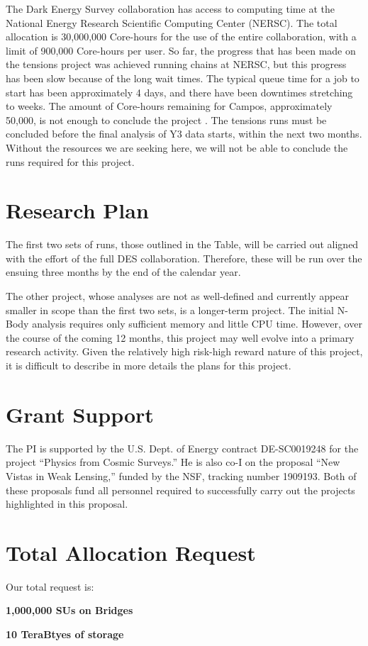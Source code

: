 \documentclass[12pt]{article}
\begin{document}
\begin{small}
The Dark Energy Survey collaboration has access to computing time at the National Energy Research Scientific Computing Center (NERSC). The total allocation is 30,000,000 Core-hours for the use of the entire collaboration, with a  limit of 900,000 Core-hours per user. So far, the progress that has been made on the tensions project was achieved running chains at NERSC, but this progress has been slow because of the long wait times. The typical queue time for a job to start has been approximately 4 days, and there have been downtimes stretching to weeks. The amount of Core-hours remaining for Campos, approximately 50,000, is not enough to conclude the project . The tensions runs must be concluded before the final analysis of Y3 data starts, within the next two months. Without the resources we are seeking here, we will not be able to conclude the runs required for this project.




\section{Research Plan}

The first two sets of runs, those outlined in the Table, will be carried out aligned with the effort of the full DES collaboration. Therefore, these will be run over the ensuing three months by the end of the calendar year.

The other project, whose analyses are not as well-defined and currently appear smaller in scope than the first two sets, is a longer-term project. The initial N-Body analysis requires only sufficient memory and little CPU time. However, over the course of the coming 12 months, this project may well evolve into a primary research activity. Given the relatively high risk-high reward nature of this project, it is difficult to describe in more details the plans for this project.

\section{Grant Support}

The PI is supported by the U.S. Dept. of Energy contract DE-SC0019248 for the project ``Physics from Cosmic Surveys.'' He is also co-I on the proposal ``New Vistas in Weak Lensing,'' funded by the NSF, tracking number 1909193. Both of these proposals fund all personnel required to successfully carry out the projects highlighted in this proposal.

\section{Total Allocation Request}

Our total request is:

{\bf 1,000,000 SUs on Bridges}

{\bf 10 TeraBtyes of storage}

\end{small}




\end{document}
